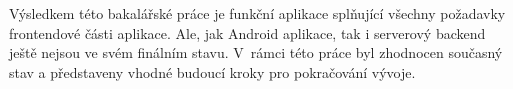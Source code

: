 Výsledkem této bakalářské práce je funkční aplikace splňující všechny požadavky frontendové části aplikace. Ale, jak Android aplikace, tak i serverový backend ještě nejsou ve svém finálním stavu. V~rámci této práce byl zhodnocen současný stav a představeny vhodné budoucí kroky pro pokračování vývoje.
